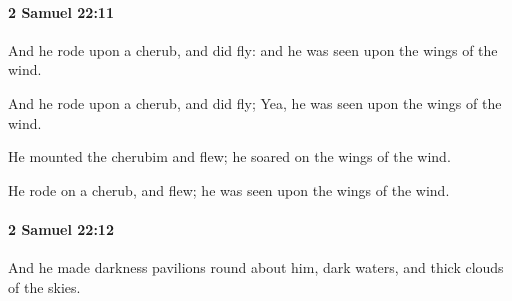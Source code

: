 		\paragraph{2 Samuel 22:11} %
			\label{2SAMUEL-22-11}

			And he rode upon a cherub, and did fly: and he was seen upon the wings of the wind.

			\begin{versebox}
					\item[BHS] 
					\item[ASV] And he rode upon a cherub, and did fly; Yea, he was seen upon the wings of the wind.
					\item[NIV] He mounted the cherubim and flew; he soared on the wings of the wind.
					\item[NRSV] He rode on a cherub, and flew; he was seen upon the wings of the wind.
			\end{versebox}

		\paragraph{2 Samuel 22:12} %
			\label{2SAMUEL-22-12}

			And he made darkness pavilions round about him, dark waters, and thick clouds of the skies.

